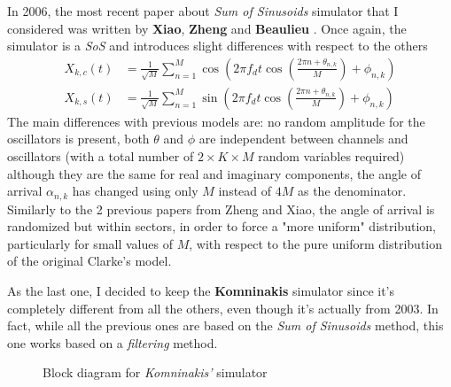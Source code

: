 In 2006, the most recent paper about \textit{Sum of Sinusoids} simulator that I considered was written by \textbf{Xiao}, \textbf{Zheng} and \textbf{Beaulieu} \cite{B1}. Once again, the simulator is a \textit{SoS} and introduces slight differences with respect to the others%
%
\begin{subequations}
	\begin{align}
	X_{k,c}(t) &= \frac{1}{\sqrt{M}} \sum_{n=1}^{M} \cos \left( 2\pi f_d t \cos \left( \frac{2\pi n  + \theta_{n,k}}{M}\right) + \phi_{n,k} \right)\\
	X_{k,s}(t) &= \frac{1}{\sqrt{M}} \sum_{n=1}^{M} \sin \left( 2\pi f_d t \cos \left( \frac{2\pi n  + \theta_{n,k}}{M}\right) + \phi_{n,k} \right)
	\end{align}
\end{subequations}%
%
The main differences with previous models are: no random amplitude for the oscillators is present, both $\theta$ and $\phi$ are independent between channels and oscillators (with a total number of $2 \times K \times M$ random variables required) although they are the same for real and imaginary components, the angle of arrival $\alpha_{n,k}$ has changed using only $M$ instead of $4M$ as the denominator. Similarly to the 2 previous papers from Zheng and Xiao, the angle of arrival is randomized but within sectors, in order to force a "more uniform" distribution, particularly for small values of $M$, with respect to the pure uniform distribution of the original Clarke's model.

As the last one, I decided to keep the \textbf{Komninakis} simulator \cite{A3} since it's completely different from all the others, even though it's actually from 2003. In fact, while all the previous ones are based on the \textit{Sum of Sinusoids} method, this one works based on a \textit{filtering} method.%
%
\begin{figure}[h!]
	\centering
	
	\caption{Block diagram for \textit{Komninakis'} simulator}
\end{figure}

